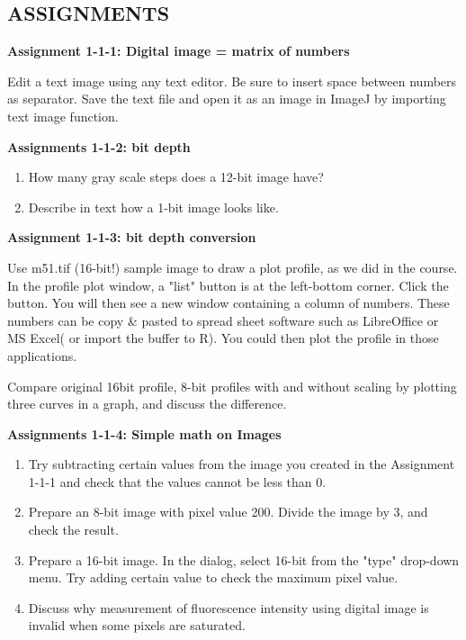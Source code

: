 \clearpage
\subsection{ASSIGNMENTS }%

\textbf{\sffamily
Assignment 1-1-1: Digital image = matrix of numbers}

Edit a text image using any text editor. Be sure to insert space between
numbers as separator. Save the text file and open it as an image in
ImageJ by importing text image function. \ \ 

\textbf{\sffamily
Assignments 1-1-2: bit depth}
\begin{enumerate}
\item How many gray scale steps does a 12-bit image have?\\
\item Describe in text how a 1-bit image looks like.
\end{enumerate}

\textbf{\sffamily
Assignment 1-1-3: bit depth conversion}

Use m51.tif (16-bit!) sample image to draw a plot profile, as we did in
the course. In the profile plot window, a
"list" button is at the left-bottom corner.
Click the button. You will then see a new window containing a column of
numbers. These numbers can be copy \& pasted to spread sheet software
such as LibreOffice or MS Excel( or import the buffer to R). You could then plot the profile
in those applications. 

Compare original 16bit profile, 8-bit profiles with and without scaling by plotting three curves in a graph,
and discuss the difference. 

\textbf{\sffamily
Assignments 1-1-4: Simple math on Images}
\begin{enumerate}
\item Try subtracting certain values from the image you created in
the Assignment 1-1-1 and check that the values cannot be less than 0. 
\item Prepare an 8-bit image with pixel value 200. Divide the
image by 3, and check the result. 

\item Prepare a 16-bit image. In the  dialog, select 16-bit from the
"type" drop-down menu. Try adding
certain value to check the maximum pixel value. 

\item Discuss why measurement of fluorescence intensity using
digital image is invalid when some pixels are saturated. 
\end{enumerate}

